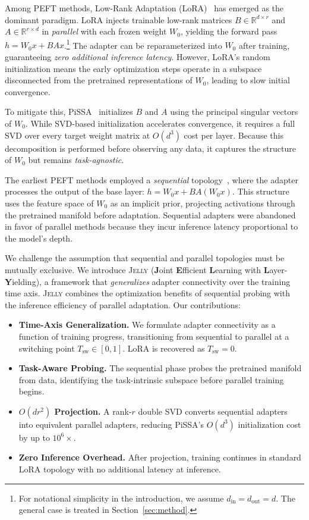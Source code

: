 \documentclass{article}
\newcommand{\Wbase}{W_0}
\newcommand{\Tswitch}{T_{\mathrm{sw}}}
\newcommand{\jelly}{\textsc{Jelly}}
\begin{document}
Among PEFT methods, Low-Rank Adaptation (LoRA)~\citep{hu2022lora} has emerged as the dominant paradigm.
LoRA injects trainable low-rank matrices $B \in \mathbb{R}^{d \times r}$ and $A \in \mathbb{R}^{r \times d}$ in \emph{parallel} with each frozen weight $\Wbase$, yielding the forward pass $h = \Wbase x + BAx$.\footnote{For notational simplicity in the introduction, we assume $d_{\mathrm{in}} = d_{\mathrm{out}} = d$. The general case is treated in Section~\ref{sec:method}.}
The adapter can be reparameterized into $\Wbase$ after training, guaranteeing \emph{zero additional inference latency}.
However, LoRA's random initialization means the early optimization steps operate in a subspace disconnected from the pretrained representations of $\Wbase$, leading to slow initial convergence.

To mitigate this, PiSSA~\citep{meng2024pissa} initializes $B$ and $A$ using the principal singular vectors of $\Wbase$.
While SVD-based initialization accelerates convergence, it requires a full SVD over every target weight matrix at $O(d^3)$ cost per layer.
Because this decomposition is performed before observing any data, it captures the structure of $\Wbase$ but remains \emph{task-agnostic}.

The earliest PEFT methods employed a \emph{sequential} topology~\citep{houlsby2019parameter}, where the adapter processes the output of the base layer: $h = \Wbase x + BA(\Wbase x)$.
This structure uses the feature space of $\Wbase$ as an implicit prior, projecting activations through the pretrained manifold before adaptation.
Sequential adapters were abandoned in favor of parallel methods because they incur inference latency proportional to the model's depth.

We challenge the assumption that sequential and parallel topologies must be mutually exclusive.
We introduce \jelly{} (\textbf{J}oint \textbf{E}fficient \textbf{L}earning with \textbf{L}ayer-\textbf{Y}ielding), a framework that \emph{generalizes} adapter connectivity over the training time axis.
\jelly{} combines the optimization benefits of sequential probing with the inference efficiency of parallel adaptation. Our contributions:

\begin{itemize}
    \item[\bf C1.] \textbf{Time-Axis Generalization.} We formulate adapter connectivity as a function of training progress, transitioning from sequential to parallel at a switching point $\Tswitch \in [0, 1]$. LoRA is recovered as $\Tswitch = 0$.
    \item[\bf C2.] \textbf{Task-Aware Probing.} The sequential phase probes the pretrained manifold from data, identifying the task-intrinsic subspace before parallel training begins.
    \item[\bf C3.] \textbf{$O(dr^2)$ Projection.} A rank-$r$ double SVD converts sequential adapters into equivalent parallel adapters, reducing PiSSA's $O(d^3)$ initialization cost by up to $10^6\times$.
    \item[\bf C4.] \textbf{Zero Inference Overhead.} After projection, training continues in standard LoRA topology with no additional latency at inference.
\end{itemize}
\end{document}

